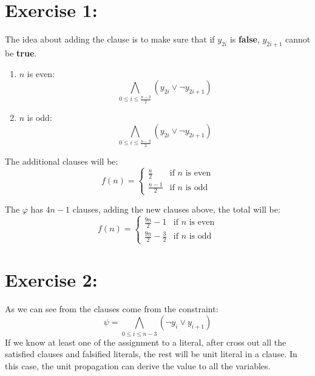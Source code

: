 \documentclass{base}
\begin{document}



\section*{Exercise 1: }
The idea about adding the clause is to make sure that if $y_{2i}$ is \textbf{false}, $y_{2i+1}$ cannot be \textbf{true}.
	\begin{enumerate}
		\item $n$ is even:
		\begin{equation}
			\bigwedge\limits_{0\leq i \leq \frac{n-2}{2}} (y_{2i}\lor \neg y_{2i+1})
		\end{equation}
		
		\item $n$ is odd:
		\begin{equation}
			\bigwedge\limits_{0\leq i \leq \frac{n-3}{2}} (y_{2i}\lor \neg y_{2i+1})
		\end{equation}
	\end{enumerate}
	The additional clauses will be:
	\[ f(n) = 
	\begin{cases} 
	\frac{n}{2} & \text{if $n$ is even} \\
	\frac{n-1}{2} & \text{if $n$ is odd}
	\end{cases}
	\]
	
	The $\varphi$ has $4n-1$ clauses, adding the new clauses above, the total will be:
		\[ f(n) = 
		\begin{cases} 
		\frac{9n}{2} -1 & \text{if $n$ is even} \\
		\frac{9n}{2} - \frac{3}{2} & \text{if $n$ is odd}
		\end{cases}
		\]

\section*{Exercise 2:}
As we can see from the clauses come from the constraint:
	\begin{equation}
		\psi = \bigwedge\limits_{0\leq i \leq n-3} (\neg y_{i}\lor y_{i+1})
	\end{equation}
If we know at least one of the assignment to a literal, after cross out all the satisfied clauses and falsified literals, the rest will be unit literal in a clause. In this case, the unit propagation can derive the value to all the variables.
\end{document}
